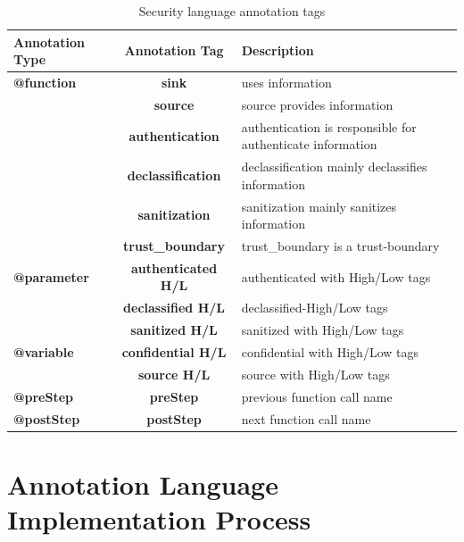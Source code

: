 \begin{table}
	\centering
\begin{tabular}{|l|c|p{5cm}|}
	\hline
	\textbf{Annotation Type} & \textbf{Annotation Tag} & \textbf{Description}\\
	\hline

	\textbf{@function}& \textbf{sink} & uses information \\
	                  & \textbf{source}& source provides information	\\
	                  & \textbf{authentication} & authentication is responsible for authenticate information	\\
	                  & \textbf{declassification}& declassification mainly declassifies information	\\
	                  & \textbf{sanitization}   & sanitization mainly sanitizes information	\\
	                  & \textbf{trust\_boundary}& trust\_boundary is a trust-boundary\\ \hline

	\textbf{@parameter}        & \textbf{authenticated H/L}& authenticated with High/Low tags\\
					  & \textbf{declassified H/L}  & declassified-High/Low tags    \\
				      & \textbf{sanitized H/L}     & sanitized with High/Low tags    \\ \hline
	\textbf{@variable}         & \textbf{confidential H/L} & confidential with High/Low tags\\
					  & \textbf{source H/L} & source with High/Low tags   \\
	\hline
	
	\textbf{@preStep}         & \textbf{preStep}  & previous function call name\\ 	\hline
	\textbf{@postStep}        & \textbf{postStep}  & next function call name\\ 	\hline

	
\end{tabular}
\vspace{1em}
\caption{Security language annotation tags}
\label{table:Security_language_annotation_tags}
\end{table}

\section{Annotation Language Implementation Process}

